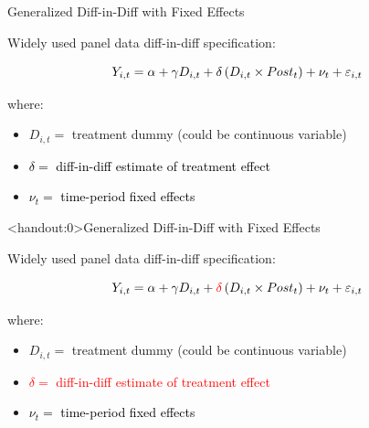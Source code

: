 \documentclass[10pt,xcolor=table,ignorenonframetext,aspectratio=169]{beamer}
\newlength{\wideitemsep}
\let\olditem\item
\renewcommand{\item}{\setlength{\itemsep}{\wideitemsep}\olditem}
\begin{document}
\begin{frame}{Generalized Diff-in-Diff with Fixed Effects}

\medskip
Widely used panel data diff-in-diff specification:  
\begin{small}
	\begin{equation*}
	Y_{i,t} = \alpha + \gamma D_{i,t} + \textcolor{black}{\delta} \left( D_{i,t} \times Post_t \right) + \textcolor{black}{\nu_t}  + \varepsilon_{i,t}
	\end{equation*}
\end{small}

\vspace{-0.32cm}

where:

\medskip
\begin{itemize}
	
	\item $D_{i,t} = $ treatment dummy (could be continuous variable)
	
	\item \textcolor{black}{$\delta = $ diff-in-diff estimate of treatment effect}
	
	\item \textcolor{black}{$\nu_t = $ time-period fixed effects}

	
\end{itemize}

\end{frame}



\begin{frame}<handout:0>{Generalized Diff-in-Diff with Fixed Effects}

\medskip
Widely used panel data diff-in-diff specification:  
\begin{small}
	\begin{equation*}
	Y_{i,t} = \alpha + \gamma D_{i,t} + \textcolor{red}{\delta} \left( D_{i,t} \times Post_t \right) + \textcolor{black}{\nu_t}  + \varepsilon_{i,t}
	\end{equation*}
\end{small}

\vspace{-0.32cm}

where:

\medskip
\begin{itemize}
	
	\item $D_{i,t} = $ treatment dummy (could be continuous variable)
	
	\item \textcolor{red}{$\delta = $ diff-in-diff estimate of treatment effect}
	
	\item \textcolor{black}{$\nu_t = $ time-period fixed effects}
	
	
\end{itemize}

\end{frame}
\end{document}
